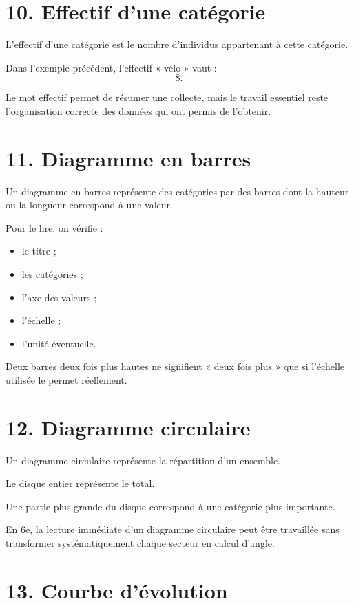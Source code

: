 \section{10. Effectif d'une catégorie}

L'effectif d'une catégorie est le nombre d'individus appartenant à cette catégorie.

Dans l'exemple précédent, l'effectif « vélo » vaut :
\[
8.
\]

Le mot effectif permet de résumer une collecte, mais le travail essentiel reste l'organisation correcte des données qui ont permis de l'obtenir.

\section{11. Diagramme en barres}

Un diagramme en barres représente des catégories par des barres dont la hauteur ou la longueur correspond à une valeur.

Pour le lire, on vérifie :
\begin{itemize}
\item le titre ;
\item les catégories ;
\item l'axe des valeurs ;
\item l'échelle ;
\item l'unité éventuelle.
\end{itemize}

Deux barres deux fois plus hautes ne signifient « deux fois plus » que si l'échelle utilisée le permet réellement.

\section{12. Diagramme circulaire}

Un diagramme circulaire représente la répartition d'un ensemble.

Le disque entier représente le total.

Une partie plus grande du disque correspond à une catégorie plus importante.

\begin{remarque}
En 6e, la lecture immédiate d'un diagramme circulaire peut être travaillée sans transformer systématiquement chaque secteur en calcul d'angle.
\end{remarque}

\section{13. Courbe d'évolution}

